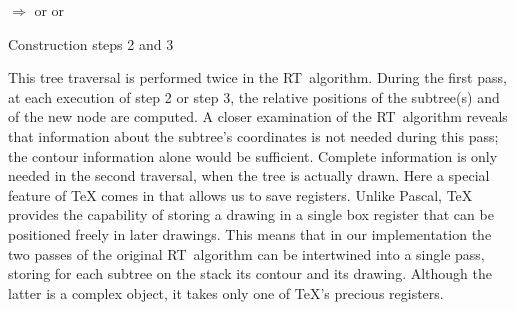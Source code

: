 \begin{Figure}
\begin{Tree}                                                                    
%                                                          
\hspace{-\l@stlmoff}\usebox{\l@sttreebox}\hspace{\l@strmoff}\quad               
$\Longrightarrow$\quad                                                          
{}%
%                                                     
\hspace{-\l@stlmoff}\raisebox{\vd@st}{\usebox\l@sttreebox}\hspace{\l@strmoff}%
\quad or\quad                                                                   
%                                                          
%                                                        
\hspace{-\l@stlmoff}\raisebox{\vd@st}{\usebox\l@sttreebox}\hspace{\l@strmoff}%
\quad or\quad                                                                   
%                                                          
%                                                    
\hspace{-\l@stlmoff}\raisebox{\vd@st}{\usebox\l@sttreebox}\hspace{\l@strmoff}%
\end{Tree}                                                                      
                                                                     
\caption{Construction steps 2 and 3}                                                   
\label{Construct}                                                              
\end{Figure}                                                                    
                                                                                
This tree traversal is performed twice in the RT~algorithm.
During the first pass,                            
at each execution of step 2 or step 3, the relative positions of the         
subtree(s) and of the new node are computed. 
A closer examination of the RT~algorithm reveals that information about the
subtree's coordinates is not needed during this pass; the contour information
alone would be sufficient. Complete information is only needed in the second
traversal, when the tree is actually drawn. Here a special feature of 
\TeX{} comes in that allows us to save registers.
Unlike Pascal, \TeX{} provides the capability of
storing a drawing in a single box register that can be positioned freely in
later drawings. This means that in our implementation the two passes
of the original RT~algorithm can be intertwined into a single pass,
storing for each subtree on the stack its contour and its drawing.
Although the latter is a complex object, it takes only one of
\TeX's precious registers.

